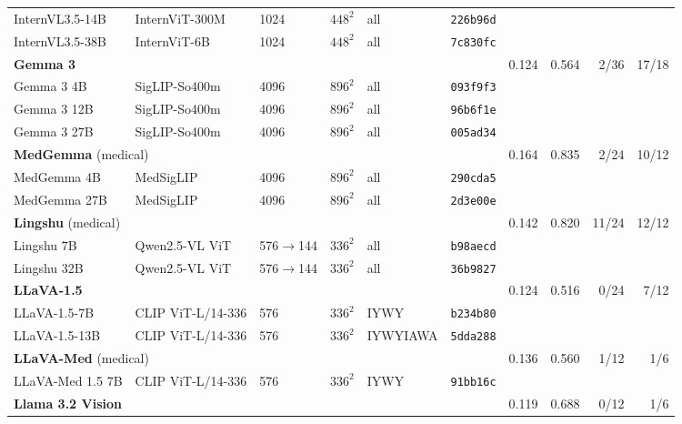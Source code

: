 \documentclass{article}
\begin{document}
\begin{table}[h]
{\begin{tabular}{llllll@{\hspace{8pt}}rrrr}
\quad InternVL3.5-14B & InternViT-300M & 1024 & $448^2$ & all & \texttt{226b96d} & & & & \\
\quad InternVL3.5-38B & InternViT-6B & 1024 & $448^2$ & all & \texttt{7c830fc} & & & & \\
\midrule
\multicolumn{6}{l}{\textbf{Gemma 3}~\citep{gemma2025gemma3}} & 0.124 & 0.564 & \cellcolor{cfTerra2}2/36 & \cellcolor{cfTerra4}17/18 \\
\quad Gemma 3 4B & SigLIP-So400m & 4096 & $896^2$ & all & \texttt{093f9f3} & & & & \\
\quad Gemma 3 12B & SigLIP-So400m & 4096 & $896^2$ & all & \texttt{96b6f1e} & & & & \\
\quad Gemma 3 27B & SigLIP-So400m & 4096 & $896^2$ & all & \texttt{005ad34} & & & & \\
\midrule
\multicolumn{6}{l}{\textbf{MedGemma} (medical)~\citep{sellergren2025medgemma}} & 0.164 & 0.835 & \cellcolor{cfTerra2}2/24 & \cellcolor{cfTerra3}10/12 \\
\quad MedGemma 4B & MedSigLIP & 4096 & $896^2$ & all & \texttt{290cda5} & & & & \\
\quad MedGemma 27B & MedSigLIP & 4096 & $896^2$ & all & \texttt{2d3e00e} & & & & \\
\midrule
\multicolumn{6}{l}{\textbf{Lingshu} (medical)~\citep{lasa2025lingshu}} & 0.142 & 0.820 & \cellcolor{cfTerra4}11/24 & \cellcolor{cfTerra4}12/12 \\
\quad Lingshu 7B & Qwen2.5-VL ViT & 576$\to$144 & $336^2$ & all & \texttt{b98aecd} & & & & \\
\quad Lingshu 32B & Qwen2.5-VL ViT & 576$\to$144 & $336^2$ & all & \texttt{36b9827} & & & & \\
\midrule
\multicolumn{6}{l}{\textbf{LLaVA-1.5}~\citep{liu2024improved}} & 0.124 & 0.516 & \cellcolor{cfTerra1}0/24 & \cellcolor{cfTerra3}7/12 \\
\quad LLaVA-1.5-7B & CLIP ViT-L/14-336 & 576 & $336^2$ & IYWY & \texttt{b234b80} & & & & \\
\quad LLaVA-1.5-13B & CLIP ViT-L/14-336 & 576 & $336^2$ & IYWYIAWA & \texttt{5dda288} & & & & \\
\midrule
\multicolumn{6}{l}{\textbf{LLaVA-Med} (medical)~\citep{li2023llavamed}} & 0.136 & 0.560 & \cellcolor{cfTerra2}1/12 & \cellcolor{cfTerra2}1/6 \\
\quad LLaVA-Med 1.5 7B & CLIP ViT-L/14-336 & 576 & $336^2$ & IYWY & \texttt{91bb16c} & & & & \\
\midrule
\multicolumn{6}{l}{\textbf{Llama 3.2 Vision}~\citep{meta2024llama32vision}} & 0.119 & 0.688 & \cellcolor{cfTerra1}0/12 & \cellcolor{cfTerra2}1/6 \\

\end{tabular}}
\end{table}
\end{document}

